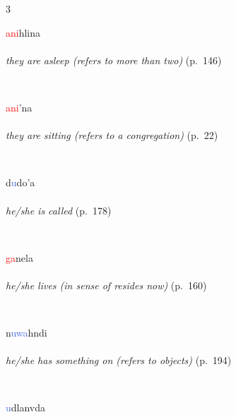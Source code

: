 \documentclass[oneside,openany]{book}%
\begin{document}
\noindent\begin{multicols}{3}%
\begin{minipage}[t]{\linewidth}
\raggedright\noindent \textcolor{Red}{ani}hlina\\
\\
\noindent \textit{they are asleep (refers to more than two)} (p.~146)
\end{minipage}\\[1em]%
\begin{minipage}[t]{\linewidth}
\raggedright\noindent \textcolor{Red}{ani}'na\\
\\
\noindent \textit{they are sitting (refers to a congregation)} (p.~22)
\end{minipage}\\[1em]%
\begin{minipage}[t]{\linewidth}
\raggedright\noindent d\textcolor{RoyalBlue}{u}do'a\\
\\
\noindent \textit{he/she is called} (p.~178)
\end{minipage}\\[1em]%
\begin{minipage}[t]{\linewidth}
\raggedright\noindent \textcolor{Red}{ga}nela\\
\\
\noindent \textit{he/she lives (in sense of resides now)} (p.~160)
\end{minipage}\\[1em]%
\begin{minipage}[t]{\linewidth}
\raggedright\noindent n\textcolor{RoyalBlue}{uwa}hndi\\
\\
\noindent \textit{he/she has something on (refers to objects)} (p.~194)
\end{minipage}\\[1em]%
\begin{minipage}[t]{\linewidth}
\raggedright\noindent \textcolor{RoyalBlue}{u}dlanvda\\
\\

\end{minipage}
\end{multicols}
\end{document}
